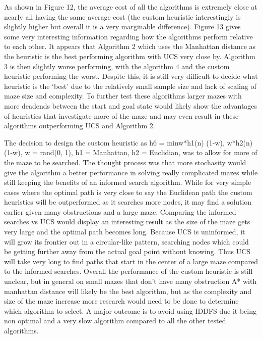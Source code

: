 \documentclass[a4paper]{article}
\begin{document}
As shown in Figure 12, the average cost of all the algorithms is extremely close at nearly all having the same average cost (the custom heuristic interestingly is slightly higher but overall it is a very marginable difference). Figure 13 gives some very interesting information regarding how the algorithms perform relative to each other. It appears that Algorithm 2 which uses the Manhattan distance as the heuristic is the best performing algorithm with UCS very close by. Algorithm 3 is then slightly worse performing, with the algorithm 4 and the custom heuristic performing the worst. Despite this, it is still very difficult to decide what heuristic is the ‘best’ due to the relatively small sample size and lack of scaling of maze size and complexity. To further test these algorithms larger mazes with more deadends between the start and goal state would likely show the advantages of heuristics that investigate more of the maze and may even result in these algorithms outperforming UCS and Algorithm 2.
\par
The decision to design the custom heuristic as h6 = min{w*h1(n) (1-w), w*h2(n) (1-w)}, w = rand(0, 1), h1 = Manhattan, h2 = Euclidian, was to allow for more of the maze to be searched. The thought process was that more stochasity would give the algorithm a better performance in solving really complicated mazes while still keeping the benefits of an informed search algorithm. While for very simple cases where the optimal path is very close to say the Euclidean path the custom heuristics will be outperformed as it searches more nodes, it may find a solution earlier given many obstructions and a large maze. Comparing the informed searches vs UCS would display an interesting result as the size of the maze gets very large and the optimal path becomes long. Because UCS is uninformed, it will grow its frontier out in a circular-like pattern, searching nodes which could be getting further away from the actual goal point without knowing. Thus UCS will take very long to find paths that start in the center of a large maze compared to the informed searches. Overall the performance of the custom heuristic is still unclear, but in general on small mazes that don’t have many obstruction A* with manhattan distance will likely be the best algorithm, but as the complexity and size of the maze increase more research would need to be done to determine which algorithm to select. A major outcome is to avoid using IDDFS due it being non optimal and a very slow algorithm compared to all the other tested algorithms.
\end{document}
